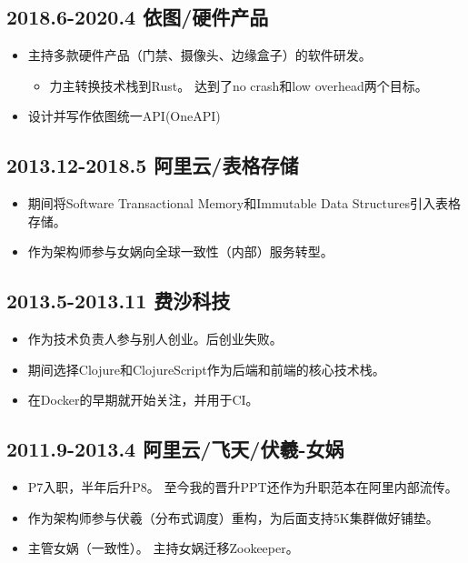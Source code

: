 \documentclass[scheme=plain]{ctexart}
\begin{document}
\subsection*{2018.6-2020.4 依图/硬件产品}

\begin{itemize}
    \item 主持多款硬件产品（门禁、摄像头、边缘盒子）的软件研发。
        \begin{itemize}
            \item 力主转换技术栈到Rust。
                达到了no crash和low overhead两个目标。
        \end{itemize}
    \item 设计并写作依图统一API(OneAPI)
\end{itemize}

\subsection*{2013.12-2018.5 阿里云/表格存储}

\begin{itemize}
    \item 期间将Software Transactional Memory和Immutable Data Structures引入表格存储。
    \item 作为架构师参与女娲向全球一致性（内部）服务转型。
\end{itemize}

\subsection*{2013.5-2013.11 费沙科技}

\begin{itemize}
    \item 作为技术负责人参与别人创业。后创业失败。
    \item 期间选择Clojure和ClojureScript作为后端和前端的核心技术栈。
    \item 在Docker的早期就开始关注，并用于CI。
\end{itemize}

\subsection*{2011.9-2013.4 阿里云/飞天/伏羲-女娲}

\begin{itemize}
    \item P7入职，半年后升P8。
        至今我的晋升PPT还作为升职范本在阿里内部流传。
    \item 作为架构师参与伏羲（分布式调度）重构，为后面支持5K集群做好铺垫。
    \item 主管女娲（一致性）。
        主持女娲迁移Zookeeper。
\end{itemize}
\end{document}
